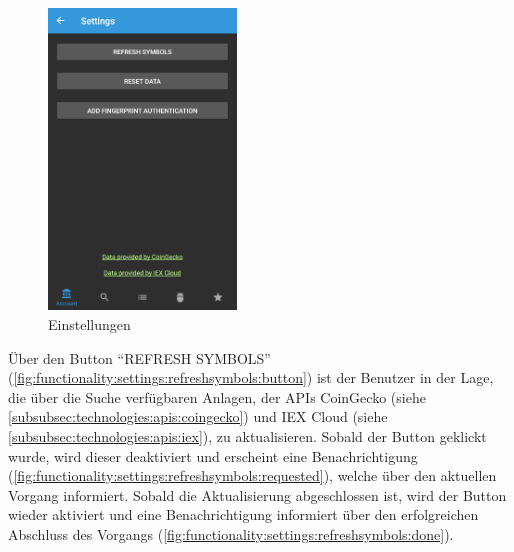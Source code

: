 \documentclass[a4paper]{article}
\begin{document}
\begin{figure}[H]
	\centering
	\includegraphics[width=.5\textwidth,height=8cm,keepaspectratio]{./images/settings/raw.png}
	\caption{Einstellungen}
	\label{fig:functionality:settings}
\end{figure}


Über den Button "`REFRESH SYMBOLS"' (\autoref{fig:functionality:settings:refreshsymbols:button}) ist der Benutzer in der Lage, die über die Suche verfügbaren Anlagen, der APIs CoinGecko (siehe \autoref{subsubsec:technologies:apis:coingecko}) und IEX Cloud (siehe \autoref{subsubsec:technologies:apis:iex}), zu aktualisieren. Sobald der Button geklickt wurde, wird dieser deaktiviert und erscheint eine Benachrichtigung (\autoref{fig:functionality:settings:refreshsymbols:requested}), welche über den aktuellen Vorgang informiert. Sobald die Aktualisierung abgeschlossen ist, wird der Button wieder aktiviert und eine Benachrichtigung informiert über den erfolgreichen Abschluss des Vorgangs (\autoref{fig:functionality:settings:refreshsymbols:done}).
\end{document}
